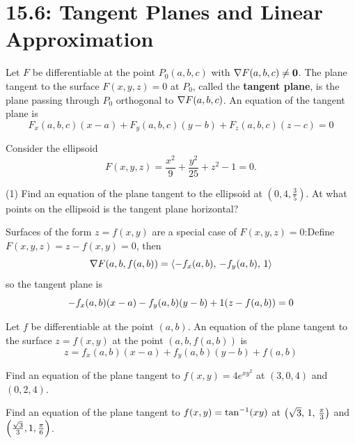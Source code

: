\documentclass[../mathNotesPreamble]{subfiles}
\begin{document}
\section{15.6: Tangent Planes and Linear Approximation}

  \begin{defn*}[Equation of the Tangent Plane for $F(x,y,z)=0$]
    Let $F$ be differentiable at the point $P_0(a,b,c)$ with $\nabla F(a,b,c)\neq \mathbf{0}$. The plane tangent to the surface $F(x,y,z)=0$ at $P_0$, called the \textbf{tangent plane}, is the plane passing through $P_0$ orthogonal to $\nabla F(a,b,c)$. An equation of the tangent plane is
      \[F_x(a,b,c)(x-a)+F_y(a,b,c)(y-b)+F_z(a,b,c)(z-c)=0\]
  \end{defn*}

  \begin{ex*}
    Consider the ellipsoid 
      \[F(x,y,z)= \frac{x^2}{9}+\frac{y^2}{25}+z^2-1=0.\]
    \begin{tasks}[after-item-skip=\stretch{1}](1)
      \task Find an equation of the plane tangent to the ellipsoid at $(0,4, \frac{3}{5})$.
      \task At what points on the ellipsoid is the tangent plane horizontal?
    \end{tasks}
  \end{ex*}
  \pagebreak

  \noindent
  Surfaces of the form $z=f(x,y)$ are a special case of $F(x,y,z)=0$:\newline Define $F(x,y,z)=z-f(x,y)=0$, then
    \[\nabla F{\left(a,b,f(a,b)\right)}={\left\langle -f_x(a,b),\,-f_y(a,b),\,1 \right\rangle}\]
  so the tangent plane is
    \[-f_x(a,b)(x-a)-f_y(a,b)(y-b)+1{\left(z-f(a,b)\right)}=0\]
  \begin{thmBox*}[Tangent Plane for $z=f(x,y)$]
    Let $f$ be differentiable at the point $(a,b)$. An equation of the plane tangent to the surface $z=f(x,y)$ at the point $(a,b,f(a,b))$ is
      \[z=f_x(a,b)(x-a)+f_y(a,b)(y-b)+f(a,b)\]
  \end{thmBox*}

  \begin{ex*}
    Find an equation of the plane tangent to $f(x,y)=4e^{xy^2}$ at $(3,0,4)$ and $(0,2,4)$.
  \end{ex*}
  \pagebreak

  \begin{ex*}
    Find an equation of the plane tangent to $f(x,y)=\tan^{-1}(xy)$ at ${\left(\sqrt{3},\,1,\,\frac{\pi}{3}\right)}$ and ${\left(\frac{\sqrt{3}}{3},1,\frac{\pi}{6}\right)}$.
  \end{ex*}
\end{document}
